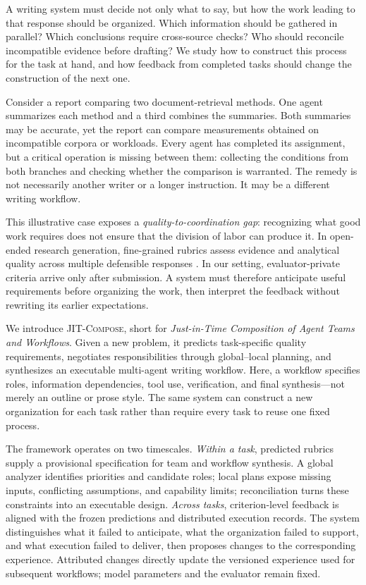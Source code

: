 \documentclass[11pt]{article}
\newcommand{\method}{\mbox{\textsc{JIT-Compose}}}
\begin{document}
A writing system must decide not only what to say, but how the work leading to that response should be organized. Which information should be gathered in parallel? Which conclusions require cross-source checks? Who should reconcile incompatible evidence before drafting? We study how to construct this process for the task at hand, and how feedback from completed tasks should change the construction of the next one.

Consider a report comparing two document-retrieval methods. One agent summarizes each method and a third combines the summaries. Both summaries may be accurate, yet the report can compare measurements obtained on incompatible corpora or workloads. Every agent has completed its assignment, but a critical operation is missing between them: collecting the conditions from both branches and checking whether the comparison is warranted. The remedy is not necessarily another writer or a longer instruction. It may be a different writing workflow.

This illustrative case exposes a \emph{quality-to-coordination gap}: recognizing what good work requires does not ensure that the division of labor can produce it. In open-ended research generation, fine-grained rubrics assess evidence and analytical quality across multiple defensible responses \citep{sharma2025researchrubrics}. In our setting, evaluator-private criteria arrive only after submission. A system must therefore anticipate useful requirements before organizing the work, then interpret the feedback without rewriting its earlier expectations.



We introduce \method, short for \emph{Just-in-Time Composition of Agent Teams and Workflows}. Given a new problem, it predicts task-specific quality requirements, negotiates responsibilities through global--local planning, and synthesizes an executable multi-agent writing workflow. Here, a workflow specifies roles, information dependencies, tool use, verification, and final synthesis---not merely an outline or prose style. The same system can construct a new organization for each task rather than require every task to reuse one fixed process.

The framework operates on two timescales. \emph{Within a task}, predicted rubrics supply a provisional specification for team and workflow synthesis. A global analyzer identifies priorities and candidate roles; local plans expose missing inputs, conflicting assumptions, and capability limits; reconciliation turns these constraints into an executable design. \emph{Across tasks}, criterion-level feedback is aligned with the frozen predictions and distributed execution records. The system distinguishes what it failed to anticipate, what the organization failed to support, and what execution failed to deliver, then proposes changes to the corresponding experience. Attributed changes directly update the versioned experience used for subsequent workflows; model parameters and the evaluator remain fixed.
\end{document}
